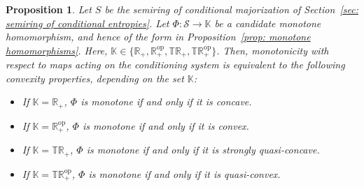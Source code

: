 \documentclass[aps,pra,11pt,onecolumn,nofootinbib,tightenlines]{revtex4-2}
\newtheorem{proposition}[theorem]{Proposition}
\theoremstyle{definition}
\newcommand{\cS}{\mathcal{S}}
\begin{document}
\begin{proposition}\label{prop:convconc}
Let $S$ be the semiring of conditional majorization of Section~\ref{sec: semiring of conditional entropies}. Let
$\Phi: \cS \to \mathbb{K}$ be a candidate monotone homomorphism, and hence of the form in Proposition~\eqref{prop: monotone homomorphisms}. Here, $\mathbb{K} \in \{\mathbb{R}_+,  \mathbb{R}_+^{\mathrm{op}},\mathbb{TR}_+,\mathbb{TR}_+^{\mathrm{op}}\}$. Then, monotonicity with respect to maps acting on the conditioning system is equivalent to the following convexity properties, depending on the set $\mathbb{K}$:
\begin{itemize}[itemsep=0pt, topsep=5pt]
\item If $\mathbb{K} =\mathbb{R}_+$, $\Phi$ is monotone if and only if it is concave.
\item If $ \mathbb{K}= \mathbb{R}_+^{\mathrm{op}}$, $\Phi$ is monotone if and only if it is convex.
\item If $ \mathbb{K}=\mathbb{TR}_+$, $\Phi$ is monotone if and only if it is strongly quasi-concave.
\item If $ \mathbb{K}=\mathbb{TR}_+^{\mathrm{op}}$, $\Phi$ is monotone if and only if it is quasi-convex.
\end{itemize}
\end{proposition}
\end{document}
